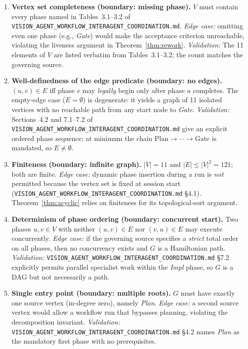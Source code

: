 \documentclass[12pt]{article}
\theoremstyle{definition}
\newcommand{\code}[1]{\texttt{#1}}
\newcommand{\VisionFlow}{\code{VISION\_AGENT\_\allowbreak WORKFLOW\_\allowbreak INTERAGENT\_\allowbreak COORDINATION.md}}
\begin{document}
\begin{enumerate}[label=\textbf{W\arabic*.}, leftmargin=*, widest=W9]

  \item \textbf{Vertex set completeness (boundary: missing phase).}
        $V$ must contain every phase named in Tables~3.1--3.2 of
        \VisionFlow{}.
        \emph{Edge case:} omitting even one phase (e.g., \textit{Gate})
        would make the acceptance criterion unreachable, violating the
        liveness argument in Theorem~\ref{thm:rework}.
        \emph{Validation:} The 11 elements of $V$ are listed verbatim
        from Tables~3.1--3.2; the count matches the governing source.

  \item \textbf{Well-definedness of the edge predicate (boundary: no
        edges).}
        $(u,v)\in E$ iff phase $v$ may \emph{legally} begin only after
        phase $u$ completes.  The empty-edge case ($E = \emptyset$) is
        degenerate: it yields a graph of 11 isolated vertices with no
        reachable path from any start node to \textit{Gate}.
        \emph{Validation:} Sections~4.2 and 7.1--7.2 of \VisionFlow{}
        give an explicit ordered phase sequence; at minimum the chain
        $\mathrm{Plan} \to \cdots \to \mathrm{Gate}$ is
        mandated, so $E \neq \emptyset$.

  \item \textbf{Finiteness (boundary: infinite graph).}
        $|V| = 11$ and $|E| \leq |V|^2 = 121$; both are finite.
        \emph{Edge case:} dynamic phase insertion during a run is
        \emph{not} permitted because the vertex set is fixed at session
        start (\VisionFlow{} \S4.1).  Theorem~\ref{thm:acyclic}
        relies on finiteness for its topological-sort argument.

  \item \textbf{Determinism of phase ordering (boundary: concurrent
        start).}
        Two phases $u, v \in V$ with neither $(u,v) \in E$ nor
        $(v,u) \in E$ may execute concurrently.
        \emph{Edge case:} if the governing source specifies a
        \emph{strict} total order on all phases, then no concurrency
        exists and $G$ is a Hamiltonian path.
        \emph{Validation:} \VisionFlow{} \S7.2 explicitly permits
        parallel specialist work within the \textit{Impl} phase, so
        $G$ is a DAG but not necessarily a path.

  \item \textbf{Single entry point (boundary: multiple roots).}
        $G$ must have exactly one source vertex (in-degree zero),
        namely \textit{Plan}.
        \emph{Edge case:} a second source vertex would allow a workflow
        run that bypasses planning, violating the decomposition
        invariant.
        \emph{Validation:} \VisionFlow{} \S4.2 names \textit{Plan} as
        the mandatory first phase with no prerequisites.


\end{enumerate}
\end{document}
